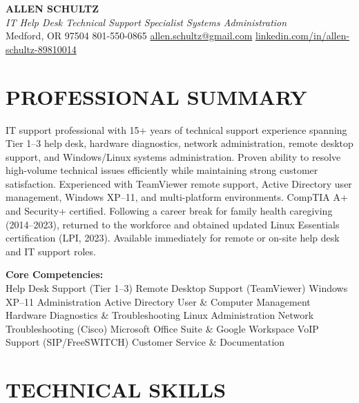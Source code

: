 \documentclass[9pt,letterpaper]{extarticle}
\begin{document}
\begin{center}
  {\LARGE\bfseries\color{accent} ALLEN SCHULTZ}\\[3pt]
  {\normalsize\itshape IT Help Desk \textbar{} Technical Support Specialist \textbar{} Systems Administration}\\[4pt]
  {\small
    Medford, OR 97504 \textbar{} 801-550-0865 \textbar{}
    \href{mailto:allen.schultz@gmail.com}{allen.schultz@gmail.com} \textbar{}
    \href{https://linkedin.com/in/allen-schultz-89810014}{linkedin.com/in/allen-schultz-89810014}
  }
\end{center}
\vspace{-10pt}
\section*{PROFESSIONAL SUMMARY}

IT support professional with 15+ years of technical support experience spanning Tier 1--3 help desk, hardware diagnostics, network administration, remote desktop support, and Windows/Linux systems administration. Proven ability to resolve high-volume technical issues efficiently while maintaining strong customer satisfaction. Experienced with TeamViewer remote support, Active Directory user management, Windows XP--11, and multi-platform environments. CompTIA A+ and Security+ certified. Following a career break for family health caregiving (2014--2023), returned to the workforce and obtained updated Linux Essentials certification (LPI, 2023). Available immediately for remote or on-site help desk and IT support roles.

\smallskip
\textbf{Core Competencies:}\\
Help Desk Support (Tier 1--3) \textbullet{}
Remote Desktop Support (TeamViewer) \textbullet{}
Windows XP--11 Administration \textbullet{}
Active Directory User \& Computer Management \textbullet{}
Hardware Diagnostics \& Troubleshooting \textbullet{}
Linux Administration \textbullet{}
Network Troubleshooting (Cisco) \textbullet{}
Microsoft Office Suite \& Google Workspace \textbullet{}
VoIP Support (SIP/FreeSWITCH) \textbullet{}
Customer Service \& Documentation

\section*{TECHNICAL SKILLS}
\end{document}

